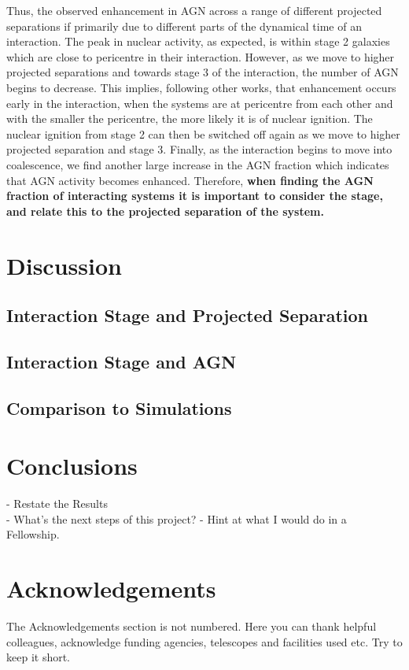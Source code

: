 \documentclass[fleqn,usenatbib]{mnras}
\begin{document}
Thus, the observed enhancement in AGN across a range of different projected separations if primarily due to different parts of the dynamical time of an interaction. The peak in nuclear activity, as expected, is within stage 2 galaxies which are close to pericentre in their interaction. However, as we move to higher projected separations and towards stage 3 of the interaction, the number of AGN begins to decrease. This implies, following other works, that enhancement occurs early in the interaction, when the systems are at pericentre from each other and with the smaller the pericentre, the more likely it is of nuclear ignition. The nuclear ignition from stage 2 can then be switched off again as we move to higher projected separation and stage 3. Finally, as the interaction begins to move into coalescence, we find another large increase in the AGN fraction which indicates that AGN activity becomes enhanced. Therefore, \textbf{when finding the AGN fraction of interacting systems it is important to consider the stage, and relate this to the projected separation of the system.}

\section{Discussion}
\subsection{Interaction Stage and Projected Separation}

\subsection{Interaction Stage and AGN}

\subsection{Comparison to Simulations}
 
\section{Conclusions}\label{conclusion}
 - Restate the Results \\
 - What's the next steps of this project?
    - Hint at what I would do in a Fellowship.
 
\section*{Acknowledgements}
The Acknowledgements section is not numbered. Here you can thank helpful
colleagues, acknowledge funding agencies, telescopes and facilities used etc.
Try to keep it short.
\end{document}
